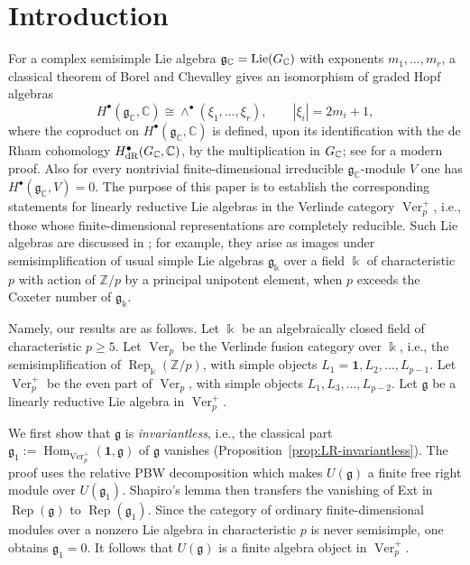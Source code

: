 \documentclass[12pt]{amsart}
\theoremstyle{remark}
\DeclareMathOperator{\Ver}{Ver}
\DeclareMathOperator{\Rep}{Rep}
\DeclareMathOperator{\Hom}{Hom}
\newcommand{\kk}{\Bbbk}
\newcommand{\g}{\mathfrak g}
\newcommand{\one}{\mathbf 1}
\begin{document}
\maketitle

\tableofcontents

\section{Introduction}

For a complex semisimple Lie algebra $\g_{\mathbb C}={\rm Lie}(G_{\Bbb C})$ with exponents
$m_1,\dots,m_r$, a classical theorem of Borel and Chevalley gives an isomorphism of graded Hopf algebras
\[
 H^\bullet(\g_{\mathbb C},\mathbb C)
 \cong \wedge^\bullet(\xi_1,\dots,\xi_r),
 \qquad |\xi_i|=2m_i+1,
\]
where the coproduct on $H^\bullet(\g_{\mathbb C},\mathbb C)$ is 
defined, upon its identification with the de Rham cohomology 
$H^\bullet_{\rm dR}(G_{\Bbb C},\Bbb C)$, by the multiplication in $G_{\Bbb C}$; see \cite{Ree95} for a modern proof. Also for every nontrivial finite-dimensional irreducible $\g_{\mathbb C}$-module $V$ one has $H^\bullet(\g_{\mathbb C},V)=0$.
The purpose of this paper is to establish the corresponding statements for
linearly reductive Lie algebras in the Verlinde category $\Ver_p^+$, i.e., those whose finite-dimensional representations are completely reducible. Such 
Lie algebras are discussed in \cite[Section~4]{CEO24}; for example, they arise as images under semisimplification of usual simple Lie algebras $\g_\kk$ over a field $\kk$ of characteristic $p$ with action of $\mathbb Z/p$ by a principal unipotent element, when $p$ exceeds the Coxeter number of $\g_\kk$. 

Namely, our results are as follows. 
Let $\kk$ be an algebraically closed field of characteristic $p\geq5$. Let
$\Ver_p$ be the Verlinde fusion category over $\kk$, i.e., the semisimplification of $\Rep_\kk(\mathbb Z/p)$, with simple objects 
$L_1=\one,L_2,\dots,L_{p-1}$. 
Let $\Ver_p^+$ be the even part of $\Ver_p$, with simple objects $L_1,L_3,\dots,L_{p-2}$. Let $\g$ be a linearly reductive 
Lie algebra in $\Ver_p^+$. 

We first show that $\g$ is {\it invariantless}, i.e., the classical part
$\g_1:=\Hom_{\Ver_p^+}(\one,\g)$ of $\g$ vanishes (Proposition~\ref{prop:LR-invariantless}). The proof uses the relative PBW decomposition which
makes $U(\g)$ a finite free right module over $U(\g_1)$. Shapiro's lemma then
transfers the vanishing of Ext in $\Rep(\g)$ to $\Rep(\g_1)$.  Since the category of ordinary finite-dimensional modules over
a nonzero Lie algebra in characteristic $p$ is never semisimple, one obtains
$\g_1=0$. It follows that $U(\g)$ is a finite algebra object in $\Ver_p^+$.
\end{document}
